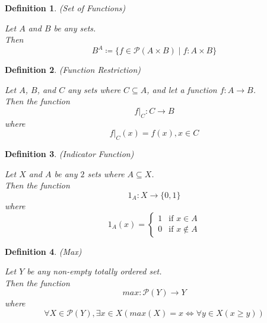 \documentclass{article}
\newtheorem{defn}{Definition}[section]
\begin{document}
\medskip

\begin{defn} (Set of Functions)
	\label{defn:function_sets}
	
	Let \(A\) and \(B\) be any sets. \\
	Then 
	\begin{equation}
		B^A \coloneq \{f \in \mathcal{P}(A \times B) \mid f : A \times B \}
	\end{equation}
\end{defn}

\begin{defn} (Function Restriction)
	\label{defn:function_restriction}
	
	Let \(A\), \(B\), and \(C\) any sets where \(C \subseteq A\), and let a function \(f : A \to B\). \\
	Then the function
	\begin{equation}
		f|_{C} : C \to B
	\end{equation}
	where 
	\begin{equation}
		f|_{C}(x) = f(x), x \in C
	\end{equation}
\end{defn}

\medskip

\begin{defn} (Indicator Function)
	\label{defn:indicator_function}
	
	Let \(X\) and \(A\) be any \(2\) sets where \(A \subseteq X\). \\ 
	Then the function
	\begin{equation}
		1_{A} : X \to \{0, 1\}
	\end{equation}
	where
	\begin{equation}
		1_{A}(x) = \begin{cases}
			1 & \text{if } x \in A \\
			0 & \text{if } x \notin A
		\end{cases}
	\end{equation}
\end{defn}

\medskip

\begin{defn} (Max)
	\label{defn:max}
	
	Let \(Y\) be any non-empty totally ordered set. \\
	Then the function
	\begin{equation}
		max : \mathcal{P}(Y) \to Y
	\end{equation}
	where
	\begin{equation}
		\forall X \in \mathcal{P}(Y), \exists x \in X(max(X) = x \iff \forall y \in X(x \geq y))
	\end{equation}
\end{defn}
\end{document}
